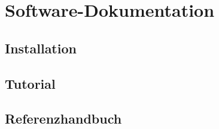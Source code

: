 \chapter{Software-Dokumentation}
\label{pd-sw-dokumentation}

\section{Installation}


\section{Tutorial}


\section{Referenzhandbuch}